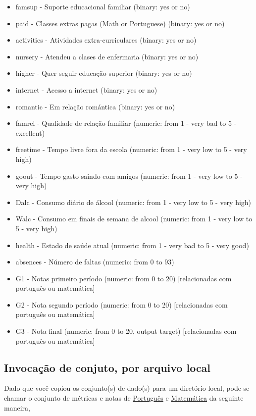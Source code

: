 \documentclass[12pt]{abntex2}
\begin{document}
\begin{itemize}
\begin{itemize}
\item famsup - Suporte educacional familiar (binary: yes or no)
\item paid - Classes extras pagas (Math or Portuguese) (binary: yes or no)
\item activities - Atividades extra-curriculares (binary: yes or no)
\item nursery - Atendeu a clases de enfermaria (binary: yes or no)
\item higher - Quer seguir educação superior (binary: yes or no)
\item internet - Acesso a internet (binary: yes or no)
\item romantic - Em relação romántica (binary: yes or no)
\item famrel - Qualidade de relação familiar (numeric: from 1 - very bad to 5 - excellent)
\item freetime - Tempo livre fora da escola (numeric: from 1 - very low to 5 - very high)
\item goout - Tempo gasto saindo com amigos (numeric: from 1 - very low to 5 - very high)
\item Dalc - Consumo diário de álcool (numeric: from 1 - very low to 5 - very high)
\item Walc - Consumo em finais de semana de alcool (numeric: from 1 - very low to 5 - very high)
\item health - Estado de saúde atual (numeric: from 1 - very bad to 5 - very good)
\item absences - Número de faltas (numeric: from 0 to 93)
\item G1 - Notas primeiro período (numeric: from 0 to 20) [relacionadas com português ou matemática]
\item G2 - Nota segundo período (numeric: from 0 to 20) [relacionadas com português ou matemática]
\end{itemize}
\end{itemize}

\begin{itemize}
\item G3 - Nota final (numeric: from 0 to 20, output target) [relacionadas com português ou matemática]
\end{itemize}
\subsection{Invocação de conjuto, por arquivo local}
\label{sec:orge4d3441}

Dado que você copiou os conjunto(s) de dado(s) para um diretório
local, pode-se chamar o conjunto de métricas e notas de \href{https://drive.google.com/file/d/1vrIpfxXLxqo4ngPDOBjyrJFhB-Ei5N4C/view?usp=sharing}{Português} e \href{https://drive.google.com/file/d/1FO2LEQhKbCX8cq6yBxqKzjrbnR18OxSD/view?usp=sharing}{Matemática} da seguinte maneira,
\end{document}
